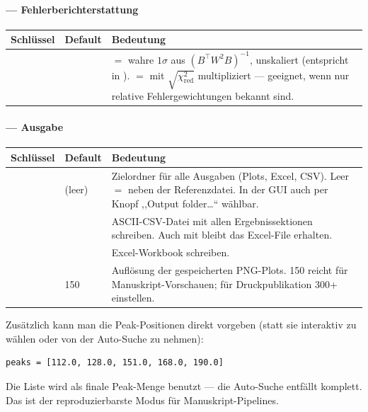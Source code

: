 \documentclass[11pt,a4paper]{article}
\begin{document}
\paragraph{\code{[errors]} --- Fehlerberichterstattung}
\begin{table}[h]\small\centering
\begin{tabularx}{\linewidth}{@{}l l L@{}}
\toprule
\textbf{Schl\"ussel} & \textbf{Default} & \textbf{Bedeutung}\\
\midrule
{} &  &  $=$ wahre $1\sigma$ aus $(B^{\top}W^2B)^{-1}$, unskaliert (entspricht  in ).  $=$ mit $\sqrt{\chi^2_\mathrm{red}}$ multipliziert --- geeignet, wenn nur relative Fehlergewichtungen bekannt sind.\\
\bottomrule
\end{tabularx}
\end{table}

\paragraph{\code{[output]} --- Ausgabe}
\begin{table}[h]\small\centering
\begin{tabularx}{\linewidth}{@{}l l L@{}}
\toprule
\textbf{Schl\"ussel} & \textbf{Default} & \textbf{Bedeutung}\\
\midrule
{} &  (leer) & Zielordner f\"ur alle Ausgaben (Plots, Excel, CSV). Leer $=$ neben der Referenzdatei. In der GUI auch per Knopf ,,Output folder\dots`` w\"ahlbar.\\
 &  & ASCII-CSV-Datei mit allen Ergebnissektionen schreiben. Auch mit  bleibt das Excel-File erhalten.\\
 &  & Excel-Workbook schreiben.\\
 & 150 & Aufl\"osung der gespeicherten PNG-Plots. 150 reicht f\"ur Manuskript-Vorschauen; f\"ur Druckpublikation 300+ einstellen.\\
\bottomrule
\end{tabularx}
\end{table}

Zus\"atzlich kann man die Peak-Positionen direkt vorgeben (statt sie interaktiv zu
w\"ahlen oder von der Auto-Suche zu nehmen):
\begin{lstlisting}[style=conf]
peaks = [112.0, 128.0, 151.0, 168.0, 190.0]
\end{lstlisting}
Die Liste wird als finale Peak-Menge benutzt --- die Auto-Suche entf\"allt
komplett. Das ist der reproduzierbarste Modus f\"ur Manuskript-Pipelines.
\end{document}
